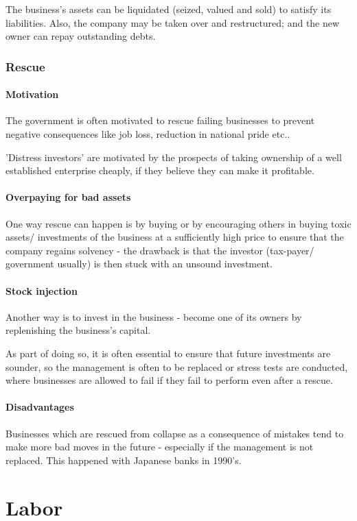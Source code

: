 \documentclass[oneside, article]{memoir}
\begin{document}
The business's assets can be liquidated (seized, valued and sold) to satisfy its liabilities. Also, the company may be taken over and restructured; and the new owner can repay outstanding debts.

\subsection{Rescue}
\subsubsection{Motivation}
The government is often motivated to rescue failing businesses to prevent negative consequences like job loss, reduction in national pride etc..

'Distress investors' are motivated by the prospects of taking ownership of a well established enterprise cheaply, if they believe they can make it profitable.

\subsubsection{Overpaying for bad assets}
One way rescue can happen is by buying or by encouraging others in buying toxic assets/ investments of the business at a sufficiently high price to ensure that the company regains solvency - the drawback is that the investor (tax-payer/ government usually) is then stuck with an unsound investment.

\subsubsection{Stock injection}
Another way is to invest in the business - become one of its owners by replenishing the business's capital.

As part of doing so, it is often essential to ensure that future investments are sounder, so the management is often to be replaced or stress tests are conducted, where businesses are allowed to fail if they fail to perform even after a rescue.

\subsubsection{Disadvantages}
Businesses which are rescued from collapse as a consequence of mistakes tend to make more bad moves in the future - especially if the management is not replaced. This happened with Japanese banks in 1990's.

\chapter{Labor}
\end{document}
